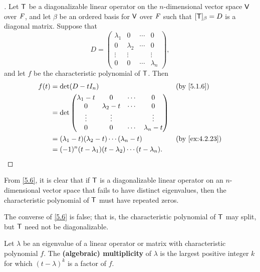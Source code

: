 \begin{proof}[]
  Let \(\mathsf{T}\) be a diagonalizable linear operator on the \(n\)-dimensional vector space \(\mathsf{V}\) over \(\mathit{F}\), and let \(\beta\) be an ordered basis for \(\mathsf{V}\) over \(\mathit{F}\) such that \([\mathsf{T}]_{\beta} = D\) is a diagonal matrix.
  Suppose that
  \[
    D = \begin{pmatrix}
      \lambda_1 & 0         & \cdots & 0         \\
      0         & \lambda_2 & \cdots & 0         \\
      \vdots    & \vdots    &        & \vdots    \\
      0         & 0         & \cdots & \lambda_n
    \end{pmatrix},
  \]
  and let \(f\) be the characteristic polynomial of \(\mathsf{T}\).
  Then
  \begin{align*}
    f(t) & = \det(D - t I_n)                                                &  & \by{5.1.6}     \\
         & = \det\begin{pmatrix}
                   \lambda_1 - t & 0             & \cdots & 0             \\
                   0             & \lambda_2 - t & \cdots & 0             \\
                   \vdots        & \vdots        &        & \vdots        \\
                   0             & 0             & \cdots & \lambda_n - t
                 \end{pmatrix}                         \\
         & = (\lambda_1 - t) (\lambda_2 - t) \cdots (\lambda_n - t)         &  & \by{ex:4.2.23} \\
         & = (-1)^n (t - \lambda_1) (t - \lambda_2) \cdots (t - \lambda_n).
  \end{align*}
\end{proof}

\begin{note}
  From \cref{5.6}, it is clear that if \(\mathsf{T}\) is a diagonalizable linear operator on an \(n\)-dimensional vector space that fails to have distinct eigenvalues, then the characteristic polynomial of \(\mathsf{T}\) must have repeated zeros.

  The converse of \cref{5.6} is false;
  that is, the characteristic polynomial of \(\mathsf{T}\) may split, but \(\mathsf{T}\) need not be diagonalizable.
\end{note}

\begin{defn}\label{5.2.3}
  Let \(\lambda\) be an eigenvalue of a linear operator or matrix with characteristic polynomial \(f\).
  The \textbf{(algebraic) multiplicity} of \(\lambda\) is the largest positive integer \(k\) for which \((t - \lambda)^k\) is a factor of \(f\).
\end{defn}

